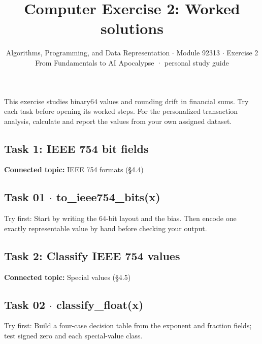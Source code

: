 \documentclass[11pt]{article}
\title{\sffamily\bfseries\color{FAUblue}Computer Exercise 2: Worked solutions}
\author{Algorithms, Programming, and Data Representation \ensuremath{\cdot} Module 92313 \ensuremath{\cdot} Exercise 2\\[2pt]\small From Fundamentals to AI Apocalypse · personal study guide}
\date{}
\begin{document}
\maketitle
\begingroup\footnotesize\setlength{\parskip}{0pt}\tableofcontents\endgroup
\clearpage

{\large This exercise studies binary64 values and rounding drift in financial sums. Try each task before opening its worked steps. For the personalized transaction analysis, calculate and report the values from your own assigned dataset.}


\begin{keepsection}
\section{Task 1: IEEE 754 bit fields}

\textbf{Connected topic:} IEEE 754 formats (§4.4)

\begin{keepsection}
\subsection{Task 01 \ensuremath{\cdot} to\_ieee754\_bits(x)}

Try first: Start by writing the 64-bit layout and the bias. Then encode one exactly representable value by hand before checking your output.

\end{keepsection}
\end{keepsection}

\begin{keepsection}
\section{Task 2: Classify IEEE 754 values}

\textbf{Connected topic:} Special values (§4.5)

\begin{keepsection}
\subsection{Task 02 \ensuremath{\cdot} classify\_float(x)}

Try first: Build a four-case decision table from the exponent and fraction fields; test signed zero and each special-value class.

\end{keepsection}
\end{keepsection}
\end{document}
